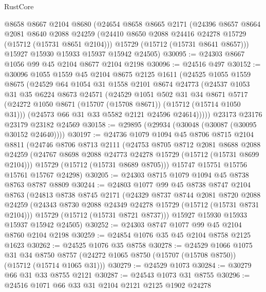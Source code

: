 \begin{lexlean}{RustCore}
\begin{coremodule}
    @8658
    @8667
    @2104
    @8680
    (@24654
      @8658
      @8665
      @2171
      (@24396
        @8657
        @8664
        @2081
        @8640
        @2088
        @24259
        (@24410 @8650 @2088 @24416 @24278 @15729 (@15712 (@15731 @8651 @2104)))
        @15729
        (@15712 (@15731 @8641 @8657)))
      @15927
      @15930
      @15933
      @15937
      @15942
      @24505)
@30095 := @24303 @8667 @1056 @99 @45 @2104 @8677 @2104 @2198
@30096 := @24516 @497
@30152 := @30096
    @1055
    @1559
    @45
    @2104
    @8675
    @2125
    @1611
    (@24525
      @1055
      @1559
      @8675
      (@24529
        @64
        @1054
        @31
        @1558
        @2101
        @8674
        @24773
        (@24537
          @1053
          @31
          @35
          @6224
          @8673
          @24571
          (@24529
            @1051
            @502
            @31
            @34
            @8671
            @5717
            (@24272 @1050 @8671 (@15707 (@15708 @8671)) (@15712 (@15714 @1050 @31)))
            (@24573 @66 @31 @33 @5582 @2121 @24596 @24614)))))
    @23173
    @23176
    @23179
    @23182
    @24569
@30158 := @29895 (@29934 (@30048 (@30087 (@30095 @30152 @24640))))
@30197 := @24736
    @1079
    @1094
    @45
    @8706
    @8715
    @2104
    @8811
    (@24746
      @8706
      @8713
      @2111
      (@24753
        @8705
        @8712
        @2081
        @8688
        @2088
        @24259
        (@24767 @8698 @2088 @24773 @24278 @15729 (@15712 (@15731 @8699 @2104)))
        @15729
        (@15712 (@15731 @8689 @8705)))
      @15747
      @15751
      @15756
      @15761
      @15767
      @24298)
@30205 := @24303 @8715 @1079 @1094 @45 @8738 @8763 @8787 @8809
@30244 := @24803
    @1077
    @99
    @45
    @8738
    @8747
    @2104
    @8763
    (@24813
      @8738
      @8745
      @2171
      (@24329
        @8737
        @8744
        @2081
        @8720
        @2088
        @24259
        (@24343 @8730 @2088 @24349 @24278 @15729 (@15712 (@15731 @8731 @2104)))
        @15729
        (@15712 (@15731 @8721 @8737)))
      @15927
      @15930
      @15933
      @15937
      @15942
      @24505)
@30252 := @24303 @8747 @1077 @99 @45 @2104 @8760 @2104 @2198
@30259 := @24854 @1076 @35 @45 @2104 @8758 @2125 @1623
@30262 := @24525 @1076 @35 @8758
@30278 := @24529
    @1066
    @1075
    @31
    @34
    @8750
    @8757
    (@24272 @1065 @8750 (@15707 (@15708 @8750)) (@15712 (@15714 @1065 @31)))
@30279 := @24529 @1073
@30284 := @30279 @66 @31 @33 @8755 @2121
@30287 := @24543 @1073 @31 @8755
@30296 := @24516 @1071 @66 @33 @31 @2104 @2121 @2125 @1902 @24278

\end{coremodule}
\end{lexlean}
